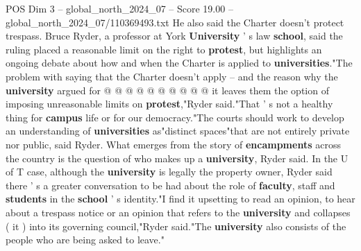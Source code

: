 \begin{textsample}{POS Dim 3 – global\_north\_2024\_07 – Score 19.00 – global\_north\_2024\_07/110369493.txt}
He also said the Charter doesn't protect trespass.
Bruce Ryder, a professor at York \textbf{University} ' s law \textbf{school}, said the ruling placed a reasonable limit on the right to \textbf{protest}, but highlights an ongoing debate about how and when the Charter is applied to \textbf{universities}."The problem with saying that the Charter doesn't apply -- and the reason why the \textbf{university} argued for @ @ @ @ @ @ @ @ @ @ it leaves them the option of imposing unreasonable limits on \textbf{protest},"Ryder said."That ' s not a healthy thing for \textbf{campus} life or for our democracy."The courts should work to develop an understanding of \textbf{universities} as"distinct spaces"that are not entirely private nor public, said Ryder.
What emerges from the story of \textbf{encampments} across the country is the question of who makes up a \textbf{university}, Ryder said.
In the U of T case, although the \textbf{university} is legally the property owner, Ryder said there ' s a greater conversation to be had about the role of \textbf{faculty}, staff and \textbf{students} in the \textbf{school} ' s identity."I find it upsetting to read an opinion, to hear about a trespass notice or an opinion that refers to the \textbf{university} and collapses ( it ) into its governing council,"Ryder said."The \textbf{university} also consists of the people who are being asked to leave."

\end{textsample}

